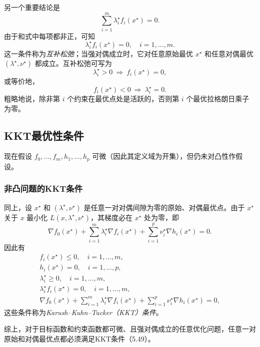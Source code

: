 另一个重要结论是
\[
\sum_{i=1}^m\lambda_i^\star f_i(x^\star)=0.
\]
由于和式中每项都非正，可知
\begin{equation}
\lambda_i^\star f_i(x^\star)=0,\quad i=1,\ldots,m.\tag{5.48}
\end{equation}
这一条件称为\emph{互补松弛}；当强对偶成立时，它对任意原始最优 $x^\star$ 和任意对偶最优 $(\lambda^\star,\nu^\star)$ 都成立。互补松弛可写为
\[
\lambda_i^\star>0\ \Longrightarrow\ f_i(x^\star)=0,
\]
或等价地，
\[
f_i(x^\star)<0\ \Longrightarrow\ \lambda_i^\star=0.
\]
粗略地说，除非第 $i$ 个约束在最优点处是活跃的，否则第 $i$ 个最优拉格朗日乘子为零。

\subsection{KKT最优性条件}
现在假设 $f_0,\ldots,f_m,h_1,\ldots,h_p$ 可微（因此其定义域为开集），但仍未对凸性作假设。

\subsubsection*{非凸问题的KKT条件}
同上，设 $x^\star$ 和 $(\lambda^\star,\nu^\star)$ 是任意一对对偶间隙为零的原始、对偶最优点。由于 $x^\star$ 关于 $x$ 最小化 $L(x,\lambda^\star,\nu^\star)$，其梯度必在 $x^\star$ 处为零，即
\[
\nabla f_0(x^\star)+\sum_{i=1}^m\lambda_i^\star\nabla f_i(x^\star)
+\sum_{i=1}^p\nu_i^\star\nabla h_i(x^\star)=0.
\]
因此有
\begin{equation}
\begin{gathered}
f_i(x^\star)\le0,\quad i=1,\ldots,m,\\
h_i(x^\star)=0,\quad i=1,\ldots,p,\\
\lambda_i^\star\ge0,\quad i=1,\ldots,m,\\
\lambda_i^\star f_i(x^\star)=0,\quad i=1,\ldots,m,\\
\nabla f_0(x^\star)+\sum_{i=1}^m\lambda_i^\star\nabla f_i(x^\star)
+\sum_{i=1}^p\nu_i^\star\nabla h_i(x^\star)=0,
\end{gathered}\tag{5.49}
\end{equation}
这些条件称为\emph{Karush--Kuhn--Tucker（KKT）条件}。

综上，对于目标函数和约束函数都可微、且强对偶成立的任意优化问题，任意一对原始和对偶最优点都必须满足KKT条件（5.49）。

